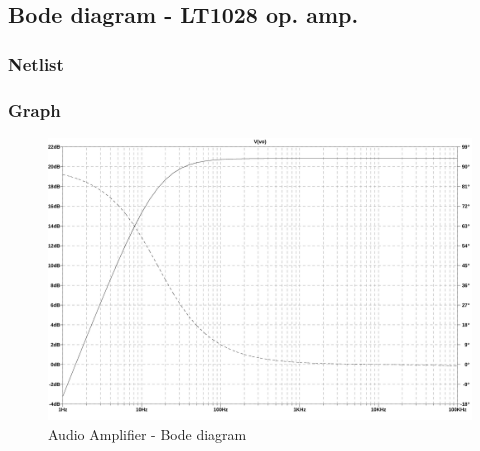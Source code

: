 \documentclass[10pt,a4paper]{article}
\begin{document}
\subsection{Bode diagram - LT1028 op. amp.}
\subsubsection{Netlist}


\subsubsection{Graph}
\begin{figure}[H]
  \centering
  \includegraphics[width=14cm]{graph/1d3.jpg}
  \caption{Audio Amplifier - Bode diagram}
  \label{1d3}
\end{figure}
\end{document}
